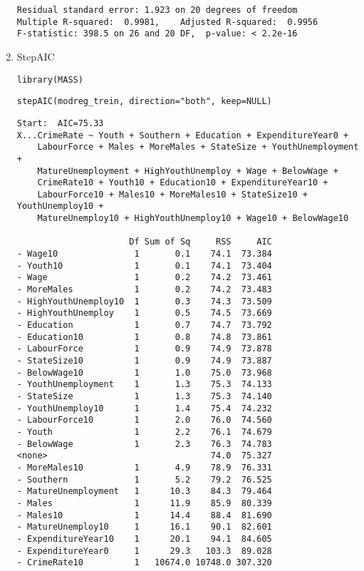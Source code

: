 \documentclass[11pt]{article}
\begin{document}
\begin{enumerate}
\begin{verbatim}
Residual standard error: 1.923 on 20 degrees of freedom
Multiple R-squared:  0.9981,	Adjusted R-squared:  0.9956 
F-statistic: 398.5 on 26 and 20 DF,  p-value: < 2.2e-16

\end{verbatim}

\item StepAIC
\label{sec:org4ea0989}
\begin{verbatim}
library(MASS)
\end{verbatim}

\begin{verbatim}
stepAIC(modreg_trein, direction="both", keep=NULL)
\end{verbatim}

\begin{verbatim}
Start:  AIC=75.33
X...CrimeRate ~ Youth + Southern + Education + ExpenditureYear0 + 
    LabourForce + Males + MoreMales + StateSize + YouthUnemployment + 
    MatureUnemployment + HighYouthUnemploy + Wage + BelowWage + 
    CrimeRate10 + Youth10 + Education10 + ExpenditureYear10 + 
    LabourForce10 + Males10 + MoreMales10 + StateSize10 + YouthUnemploy10 + 
    MatureUnemploy10 + HighYouthUnemploy10 + Wage10 + BelowWage10

                      Df Sum of Sq     RSS     AIC
- Wage10               1       0.1    74.1  73.384
- Youth10              1       0.1    74.1  73.404
- Wage                 1       0.2    74.2  73.461
- MoreMales            1       0.2    74.2  73.483
- HighYouthUnemploy10  1       0.3    74.3  73.509
- HighYouthUnemploy    1       0.5    74.5  73.669
- Education            1       0.7    74.7  73.792
- Education10          1       0.8    74.8  73.861
- LabourForce          1       0.9    74.9  73.878
- StateSize10          1       0.9    74.9  73.887
- BelowWage10          1       1.0    75.0  73.968
- YouthUnemployment    1       1.3    75.3  74.133
- StateSize            1       1.3    75.3  74.140
- YouthUnemploy10      1       1.4    75.4  74.232
- LabourForce10        1       2.0    76.0  74.560
- Youth                1       2.2    76.1  74.679
- BelowWage            1       2.3    76.3  74.783
<none>                                74.0  75.327
- MoreMales10          1       4.9    78.9  76.331
- Southern             1       5.2    79.2  76.525
- MatureUnemployment   1      10.3    84.3  79.464
- Males                1      11.9    85.9  80.339
- Males10              1      14.4    88.4  81.690
- MatureUnemploy10     1      16.1    90.1  82.601
- ExpenditureYear10    1      20.1    94.1  84.605
- ExpenditureYear0     1      29.3   103.3  89.028
- CrimeRate10          1   10674.0 10748.0 307.320


\end{verbatim}
\end{enumerate}
\end{document}
